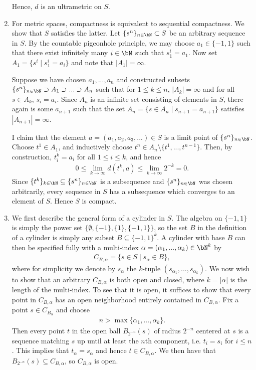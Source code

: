 \begin{homework}[e]
\begin{prf}
\begin{enumerate}[(1)]
				Hence, $d$ is an ultrametric on $S$.
			\item For metric spaces, compactness is equivalent to sequential compactness. We show that $S$ satisfies the latter. Let $\{s^n\}_{n\in \bN} \subset S$ be an arbitrary sequence in $S$. By the countable pigeonhole principle, we may choose $a_1 \in \{-1,1\}$ such that there exist infinitely many $i \in \bN$ such that $s^i_1 = a_1$. Now set $A_1 = \{s^i \mid s^i_1 = a_i\}$ and note that $|A_1| = \infty$.

				Suppose we have chosen $a_1,...,a_n$ and constructed subsets $\{s^n\}_{n\in \bN} \supset A_1 \supset ... \supset A_n$ such that for $1\leq k\leq n$, $|A_k| = \infty$ and for all $s \in A_k$, $s_i = a_i$. Since $A_n$ is an infinite set consisting of elements in $S$, there again is some $a_{n+1}$ such that the set $A_n = \{s \in A_n \mid s_{n+1} = a_{n+1}\}$ satisfies $|A_{n+1}| = \infty$.

				I claim that the element $a = (a_1,a_2,a_3,...) \in S$ is a limit point of $\{s^n\}_{n\in \bN}$. Choose $t^1 \in A_1$, and inductively choose $t^n \in A_n \setminus \{t^1,...,t^{n-1}\}$. Then, by construction, $t^k_i = a_i$ for all $1\leq i\leq k$, and hence
				\begin{align*}
					0 \leq \lim_{k \to \infty} d(t^k, a) \leq \lim_{k\to \infty} 2^{-k} = 0.
				\end{align*}
				Since $\{t^k\}_{k\in \bN}\subseteq \{s^n\}_{n\in \bN}$ is a subsequence and $\{s^n\}_{n\in \bN}$ was chosen arbitrarily, every sequence in $S$ has a subsequence which converges to an element of $S$. Hence $S$ is compact.
			\item We first describe the general form of a cylinder in $S$. The algebra on $\{-1,1\}$ is simply the power set $\{\emptyset,\{-1\},\{1\},\{-1,1\}\}$, so the set $B$ in the definition of a cylinder is simply any subset $B \subseteq \{-1,1\}^k$. A cylinder with base $B$ can then be specified fully with a multi-index $\alpha = (\alpha_1,...,\alpha_k)\in \bN^k$ by
				\begin{align*}
					C_{B,\alpha} = \{s \in S \mid s_\alpha \in B\},
				\end{align*}
			where for simplicity we denote by $s_\alpha$ the $k$-tuple $(s_{\alpha_1},...,s_{\alpha_k})$. We now wish to show that an arbitrary $C_{B,\alpha}$ is both open and closed, where $k = |\alpha|$ is the length of the multi-index. To see that it is open, it suffices to show that every point in $C_{B,\alpha}$ has an open neighborhood entirely contained in $C_{B,\alpha}$. Fix a point $s \in C_{B_\alpha}$ and choose 
			\begin{align*}
				n > \max\{\alpha_1,...,\alpha_k\}.
			\end{align*}
			Then every point $t$ in the open ball $B_{2^{-n}}(s)$ of radius $2^{-n}$ centered at $s$ is a sequence matching $s$ up until at least the $n$th component, i.e. $t_i = s_i$ for $i \leq n$. This implies that $t_\alpha = s_\alpha$ and hence $t \in C_{B,\alpha}$. We then have that $B_{2^{-n}}(s) \subseteq C_{B,\alpha}$, so $C_{B,\alpha}$ is open.


\end{enumerate}
\end{prf}
\end{homework}
